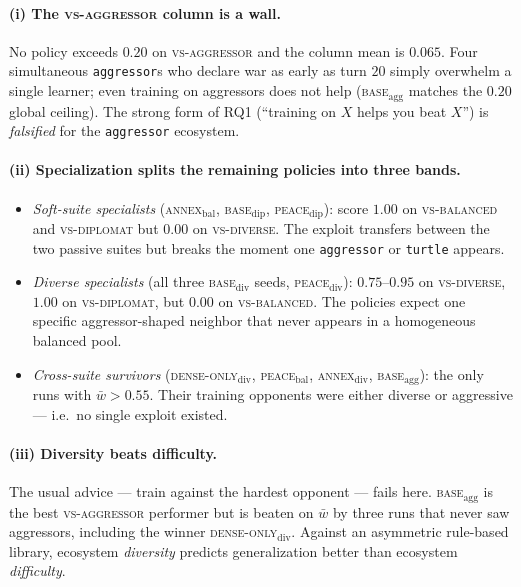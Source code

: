 \paragraph{(i) The \textsc{vs-aggressor} column is a wall.}
No policy exceeds $0.20$ on \textsc{vs-aggressor} and the column mean is
$0.065$. Four simultaneous \texttt{aggressor}s who declare war as early as
turn $20$ simply overwhelm a single learner; even training on aggressors does
not help (\textsc{base}$_{\text{agg}}$ matches the $0.20$ global ceiling).
The strong form of RQ1 (``training on $X$ helps you beat $X$'') is
\emph{falsified} for the \texttt{aggressor} ecosystem.

\paragraph{(ii) Specialization splits the remaining policies into three bands.}
\begin{itemize}
    \item \emph{Soft-suite specialists} (\textsc{annex}$_{\text{bal}}$,
          \textsc{base}$_{\text{dip}}$, \textsc{peace}$_{\text{dip}}$): score
          $1.00$ on \textsc{vs-balanced} and \textsc{vs-diplomat} but $0.00$
          on \textsc{vs-diverse}. The exploit transfers between the two
          passive suites but breaks the moment one \texttt{aggressor} or
          \texttt{turtle} appears.
    \item \emph{Diverse specialists} (all three \textsc{base}$_{\text{div}}$
          seeds, \textsc{peace}$_{\text{div}}$): $0.75$--$0.95$ on
          \textsc{vs-diverse}, $1.00$ on \textsc{vs-diplomat}, but $0.00$ on
          \textsc{vs-balanced}. The policies expect one specific
          aggressor-shaped neighbor that never appears in a homogeneous
          balanced pool.
    \item \emph{Cross-suite survivors}
          (\textsc{dense-only}$_{\text{div}}$, \textsc{peace}$_{\text{bal}}$,
          \textsc{annex}$_{\text{div}}$, \textsc{base}$_{\text{agg}}$): the
          only runs with $\bar{w}>0.55$. Their training opponents were either
          diverse or aggressive --- i.e.\ no single exploit existed.
\end{itemize}

\paragraph{(iii) Diversity beats difficulty.}
The usual advice --- train against the hardest opponent --- fails here.
\textsc{base}$_{\text{agg}}$ is the best \textsc{vs-aggressor} performer but
is beaten on $\bar{w}$ by three runs that never saw aggressors, including the
winner \textsc{dense-only}$_{\text{div}}$. Against an asymmetric rule-based
library, ecosystem \emph{diversity} predicts generalization better than
ecosystem \emph{difficulty}.


